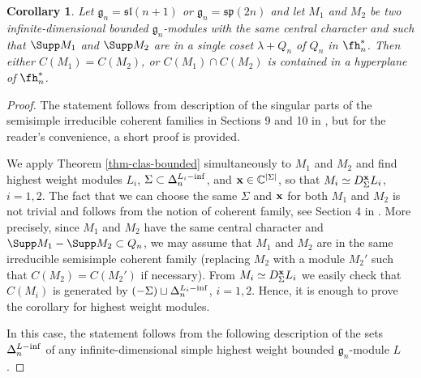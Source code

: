 \documentclass[12pt]{amsart}
\def\gg{\mathfrak{g}}
\newtheorem{cor}[thm]{Corollary}
\begin{document}
\begin{cor} \label{cor-cones}
Let $\gg_n = \mathfrak{sl}({n+1})$ or $\gg_n = \mathfrak{sp}({2n})$ and let $M_1$ and $M_2$ be two infinite-dimensional bounded $\gg_n$-modules with the same central character and such that $\Supp M_1$ and $\Supp M_2$ are in a single  coset $\lambda + Q_n$ of $Q_n$ in $\fh_n^*$. Then either $C(M_1) = C(M_2)$, or $C(M_1) \cap C(M_2)$ is contained in a hyperplane of $\fh_n^*$. 
\end{cor}
\begin{proof}  The statement follows from description of the singular parts of the semisimple irreducible coherent families in Sections 9 and 10 in \cite{M}, but for the reader's convenience, a short proof is provided.

 We  apply Theorem \ref{thm-clas-bounded} simultaneously to $M_1$ and $M_2$ and find highest weight modules $L_i$, $\Sigma \subset \Delta_n^{L_i-{\rm inf}}$, and  ${\bf x} \in {\mathbb C}^{|\Sigma|}$, so that $M_i \simeq D_{\Sigma}^{\bf x}L_i$, $i = 1,2$. The fact that we can choose the same $\Sigma$ and ${\bf x}$ for both $M_1$ and $M_2$ is not trivial and follows from the notion of coherent family, see Section 4 in \cite{M}. More precisely, since $M_1$ and $M_2$ have the same central character and $\Supp M_1 - \Supp M_2 \subset Q_n$, we may assume that $M_1$ and $M_2$ are in the same irreducible semisimple coherent family (replacing $M_2$ with a module $M_2'$ such that $C(M_2) = C(M_2')$ if necessary).  From $M_i \simeq D_{\Sigma}^{\bf x}L_i$ we  easily  check that $C(M_i)$ is generated by $(-\Sigma) \sqcup \Delta_n^{L_i-{\rm inf}}$, $i=1,2$. Hence, it is enough to prove the corollary for highest weight modules. 
 
 In this case, the statement follows from the following description of the sets $\Delta_n^{L-{\rm inf}}$ of any infinite-dimensional  simple highest weight bounded $\gg_n$-module $L$.  
 

\end{proof}
\end{document}
